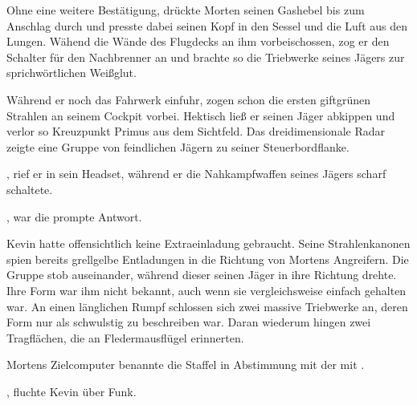 \par

Ohne eine weitere Bestätigung, drückte Morten seinen Gashebel bis zum Anschlag durch und presste dabei seinen Kopf in den Sessel und die Luft aus den Lungen. Wähend die Wände des Flugdecks an ihm vorbeischossen, zog er den Schalter für den Nachbrenner an und brachte so die Triebwerke seines Jägers zur sprichwörtlichen Weißglut.

\par

Während er noch das Fahrwerk einfuhr, zogen schon die ersten giftgrünen Strahlen an seinem Cockpit vorbei. Hektisch ließ er seinen Jäger abkippen und verlor so Kreuzpunkt Primus aus dem Sichtfeld. Das dreidimensionale Radar zeigte eine Gruppe von feindlichen Jägern zu seiner Steuerbordflanke.

\par

, rief er in sein Headset, während er die Nahkampfwaffen seines Jägers scharf schaltete.

\par

, war die prompte Antwort. 

\par

Kevin hatte offensichtlich keine Extraeinladung gebraucht. Seine Strahlenkanonen spien bereits grellgelbe Entladungen in die Richtung von Mortens Angreifern. Die Gruppe stob auseinander, während dieser seinen Jäger in ihre Richtung drehte. Ihre Form war ihm nicht bekannt, auch wenn sie vergleichsweise einfach gehalten war. An einen länglichen Rumpf schlossen sich zwei massive Triebwerke an, deren Form nur als schwulstig zu beschreiben war. Daran wiederum hingen zwei Tragflächen, die an Fledermausflügel erinnerten.

\par

Mortens Zielcomputer benannte die Staffel in Abstimmung mit der  mit .

\par

, fluchte Kevin über Funk. 

\par

